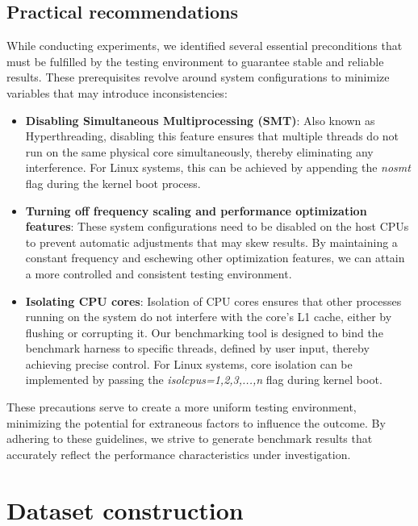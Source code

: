 \subsection{Practical recommendations}

While conducting experiments, we identified several essential preconditions that must be fulfilled by 
the testing environment to guarantee stable and reliable results. These prerequisites revolve around 
system configurations to minimize variables that may introduce inconsistencies:

\begin{itemize}
	\item \textbf{Disabling Simultaneous Multiprocessing (SMT)}: Also known as Hyperthreading,
	       disabling this feature ensures that multiple threads do not run on the same physical
	       core simultaneously, thereby eliminating any interference. For Linux systems, this
	       can be achieved by appending the \textit{nosmt} flag during the kernel boot process.
	\item \textbf{Turning off frequency scaling and performance optimization features}: These
	       system configurations need to be disabled on the host CPUs to prevent automatic
	       adjustments that may skew results. By maintaining a constant frequency and eschewing
	       other optimization features, we can attain a more controlled and consistent testing environment.
	\item \textbf{Isolating CPU cores}: Isolation of CPU cores ensures that other processes
	       running on the system do not interfere with the core's L1 cache, either by flushing
	       or corrupting it. Our benchmarking tool is designed to bind the benchmark harness to
	       specific threads, defined by user input, thereby achieving precise control. For Linux
	       systems, core isolation can be implemented by passing the \textit{isolcpus=1,2,3,...,n}
	       flag during kernel boot.
\end{itemize}

These precautions serve to create a more uniform testing environment, minimizing the potential for 
extraneous factors to influence the outcome. By adhering to these guidelines, we strive to generate 
benchmark results that accurately reflect the performance characteristics under investigation.

\section{Dataset construction}

